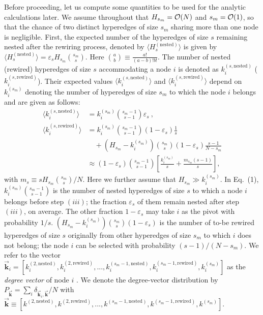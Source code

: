 \documentclass[aps,pre,twocolumn,nofootinbib,superscriptaddress,showpacs,showkeys]{revtex4-1}
\begin{document}
Before proceeding, let us compute some quantities to be used for the analytic calculations later. 
We assume throughout that $H_{s_m}={\cal O}(N)$ and $s_m={\cal O}(1)$, so that the chance of two distinct hyperedges of size $s_m$ sharing more than one node is negligible.
First, the expected number of the hyperedges of size $s$ remaining nested after the rewiring process, denoted by $\langle H^{(\mathrm{nested})}_s \rangle$ is given by $\langle H^{(\mathrm{nested})}_s \rangle=\varepsilon_s H_{s_m}{s_m \choose s}$. Here ${a \choose b}\equiv \frac{a!}{(a-b)!b!}$. 
The number of nested (rewired) hyperedges of size $s$ accommodating a node $i$ is denoted as $k^{(s,\mathrm{nested})}_i$ ($k^{(s,\mathrm{rewired})}_i$). Their expected values $\langle k^{(s,\mathrm{nested})}_i \rangle$ and $\langle k^{(s,\mathrm{rewired})}_i \rangle$ depend on $k^{(s_m)}_i$ denoting the number of hyperedges of size $s_m$ to which the node $i$ belongs and are given as follows:
\begin{align}
\langle k^{(s,\mathrm{nested})}_i \rangle&=k^{(s_m)}_i{s_m-1 \choose s-1}\varepsilon_s~,\nonumber
\\
\langle k^{(s,\mathrm{rewired})}_i \rangle &=k^{(s_m)}_i{s_m-1 \choose s-1}(1-\varepsilon_s)\frac{1}{s}\nonumber
\\
&\quad+(H_{s_m}-k^{(s_m)}_i){s_m \choose s}(1-\varepsilon_s)\frac{s-1}{N-s_m}\nonumber
\\
&\approx (1-\varepsilon_s){s_m-1 \choose s-1}\left[\frac{k^{(s_m)}_i}{s}+\frac{m_{s_m}(s-1)}{s}\right],
\label{eq:averdeg}
\end{align}
with $m_{s}\equiv s H_{s_m}{s_m \choose s}/N$. Here we further assume that $H_{s_m}\gg k^{(s_m)}_i$. In Eq.~(1), $k^{(s_m)}_i{s_m-1 \choose s-1}$ is the number of nested hyperedges of size $s$ to which a node $i$ belongs before step $(iii)$; the fraction $\varepsilon_s$ of them remain nested after step $(iii)$, on average. The other fraction $1-\varepsilon_s$ may take $i$ as the pivot with probability $1/s$. $(H_{s_m}-k^{(s_m)}_i){s_m \choose s}(1-\varepsilon_s)$ is the number of to-be rewired hyperedges of size $s$ originally from other hyperedges of size $s_m$ to which $i$ does not belong; the node $i$ can be selected with probability $(s-1)/(N-s_m)$.
We refer to the vector $\vec{\mathbf{k}}_i=\left[ k^{(2,\mathrm{nested})}_i, k^{(2,\mathrm{rewired})}_i,...,k^{(s_m-1,\mathrm{nested})}_i,k^{(s_m-1,\mathrm{rewired})}_i,k^{(s_m)}_i\right]$ as the \textit{degree vector} of node $i$ \cite{r28}.
We denote the degree-vector distribution by $P_{\vec{\mathbf{k}}}=\sum\limits_{i} \delta_{\vec{\mathbf{k}}_i,\vec{\mathbf{k}}}/N$ with  $\vec{\mathbf{k}}\equiv\left[k^{(2,\mathrm{nested})},k^{(2,\mathrm{rewired})},...,k^{(s_m-1,\mathrm{nested})},k^{(s_m-1,\mathrm{rewired})},k^{(s_m)}\right]$. 
\end{document}

